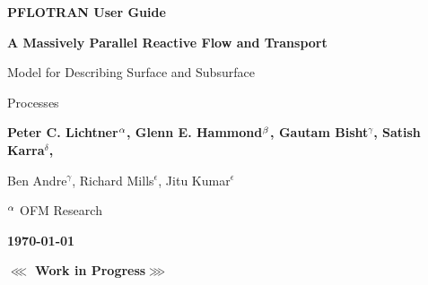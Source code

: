 \begin{center}

\dblline

\vspace{1 cm}

{\bf\huge PFLOTRAN User Guide}

\vspace{1cm}

{\bf\LARGE A Massively Parallel Reactive Flow and Transport 

Model for Describing Surface and Subsurface 

Processes}

\vspace{3cm}

{\bf\large Peter C. Lichtner$^{\alpha}$, Glenn E. Hammond$^{\beta}$, Gautam Bisht$^\gamma$, Satish Karra$^\delta$, 

Ben Andre$^\gamma$, Richard Mills$^\epsilon$, Jitu Kumar$^\epsilon$}

\vspace{1cm}

$^{\alpha}$ OFM Research

\vspace{3cm}

{\bf\large\today}


\vspace{1cm}

{\bf\LARGE $\lll$ Work in Progress$\ggg$}

\end{center}

